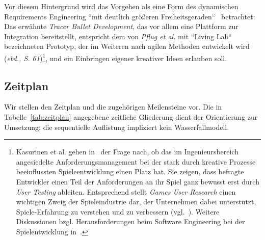 Vor diesem Hintergrund wird das Vorgehen als eine Form des dynamischen Requirements Engineering ``mit deutlich größeren Freiheitsgeraden``~\cite[60]{MRP21} betrachtet: Das erwähnte \textit{Tracer Bullet Development}, das vor allem eine Plattform zur Integration bereitstellt, entspricht dem von \textit{Pflug et al.} mit ``Living Lab`` bezeichneten Prototyp, der im Weiteren nach agilen Methoden entwickelt wird (\textit{ebd., S. 61})\footnote{
    Kasurinen et al. gehen in~\cite[]{KMS14} der Frage nach, ob das im Ingenieursbereich angesiedelte Anforderungsmanagement bei der stark durch kreative Prozesse beeinflussten Spieleentwicklung einen Platz hat. Sie zeigen, dass befragte Entwickler einen Teil der Anforderungen an ihr Spiel ganz bewusst erst durch \textit{User Testing} ableiten. Entsprechend stellt \textit{Games User Research} einen wichtigen Zweig der Spieleindustrie dar, der Unternehmen dabei unterstützt, Spiele-Erfahrung zu verstehen und zu verbessern (vgl.~\cite[26]{Zam18}). Weitere Diskussionen bzgl. Herausforderungen beim Software Engineering bei der Spielentwicklung in~\cite[]{KH09}.
}, und ein Einbringen eigener kreativer Ideen erlauben soll.\\

\subsection{Zeitplan}

Wir stellen den Zeitplan und die zugehörigen Meilensteine vor.
Die in Tabelle~\ref{tab:zeitplan} angegebene zeitliche Gliederung dient der Orientierung zur Umsetzung; die sequentielle Auflistung impliziert kein Wasserfallmodell.

